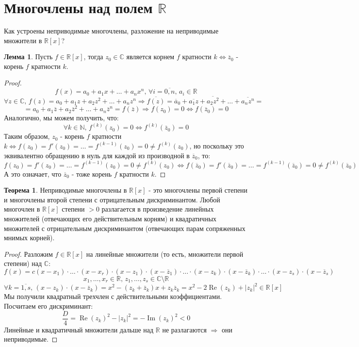 \documentclass[12pt]{article}
\newcommand{\MR}{\mathbb{R}}
\newcommand{\MC}{\mathbb{C}}
\newcommand{\MN}{\mathbb{N}}
\theoremstyle{definition}
\newtheorem{lemma}{Лемма}
\newtheorem{theorem}{Теорема}
\newcommand{\ovl}[1]{\overline{#1}}
\DeclareMathOperator{\IM}{\operatorname{Im}}
\DeclareMathOperator{\RE}{\operatorname{Re}}
\begin{document}
\section*{Многочлены над полем $\MR$}
Как устроены неприводимые многочлены, разложение на неприводимые множители в $\MR[x]$?
\begin{lemma}
	Пусть $f \in \MR[x]$, тогда $z_0 \in \MC$ является корнем $f$ кратности $k \Leftrightarrow \ovl{z}_0$ - корень $f$ кратности $k$.
\end{lemma}
\begin{proof}
	$$
		f(x) = a_0 + a_1x + \dotsc + a_n x^n, \, \forall i =\ovl{0,n}, \, a_i \in \MR
	$$
	$$
		\forall z \in \MC, \, f(z) = a_0 + a_1z+ a_2 z^2 + \dotsc + a_n z^n \Rightarrow \ovl{f(z)} = \ovl{a}_0 + \ovl{a_1z} + \ovl{a_2z^2} + \dotsc+ \ovl{a_nz^n} = 
	$$
	$$
		= a_0 + a_1\ovl{z} + a_2\ovl{z}^2	+ \dotsc + a_n\ovl{z}^n = f(\ovl{z}) \Rightarrow f(z_0) = 0 \Leftrightarrow f(\ovl{z}_0) = 0
	$$
	Аналогично, мы можем получить, что: 
	$$
		\forall k \in \MN, \, f^{(k)}(z_0) = 0 \Leftrightarrow f^{(k)}(\ovl{z}_0) = 0
	$$
	Таким образом, $z_0$ - корень $f$ кратности $k \Leftrightarrow f(z_0) = f'(z_0) = \dotsc = f^{(k-1)}(z_0) = 0 \neq f^{(k)}(z_0)$, но поскольку это эквивалентно обращению в нуль для каждой из производной в $\ovl{z}_0$, то:
	$$
		f(z_0) = f'(z_0) = \dotsc = f^{(k-1)}(z_0) = 0 \neq f^{(k)}(z_0) \Leftrightarrow f(\ovl{z}_0) = f'(\ovl{z}_0) = \dotsc = f^{(k-1)}(\ovl{z}_0) = 0 \neq f^{(k)}(\ovl{z}_0)
	$$
	А это означает, что $\ovl{z}_0$ - тоже корень $f$ кратности $k$.
\end{proof}

\begin{theorem}
	Неприводимые многочлены в $\MR[x]$ - это многочлены первой степени и многочлены второй степени с отрицательным дискриминантом. Любой многочлен в $\MR[x]$ степени $> 0$ разлагается в произведение линейных множителей (отвечающих его действительным корням) и квадратичных множителей с отрицательным дискриминантом (отвечающих парам сопряженных мнимых корней).
\end{theorem}
\begin{proof}
	Разложим $f \in \MR[x]$ на линейные множители (то есть, множители первой степени) над $\MC$:
	$$
		f(x) = c(x - x_1){\cdot}\dotsc{\cdot}(x - x_r){\cdot}(x - z_1){\cdot}(x - \ovl{z}_1){\cdot}\dotsc{\cdot}(x - z_k){\cdot}(x - \ovl{z}_k){\cdot}\dotsc{\cdot}(x - z_s){\cdot}(x - \ovl{z}_s)
	$$
	$$
		x_1,\dotsc, x_r \in \MR, \, z_1, \dotsc, z_s \in \MC \setminus \MR
	$$
	$$
		\forall k = \ovl{1,s}, \, (x - z_k){\cdot}(x - \ovl{z}_k)= x^2 - (z_k + \ovl{z}_k)x + z_k\ovl{z}_k = x^2 - 2\RE(z_k) + |z_k|^2 \in \MR[x]
	$$
	Мы получили квадратный трехчлен с действительными коэффициентами. Посчитаем его дискриминант:
	$$
		\dfrac{D}{4} = \RE(z_k)^2 - |z_k|^2 = - \IM(z_k)^2 < 0
	$$
	Линейные и квадратичный множители дальше над $\MR$ не разлагаются $\Rightarrow$ они неприводимые.
\end{proof}
\end{document}
